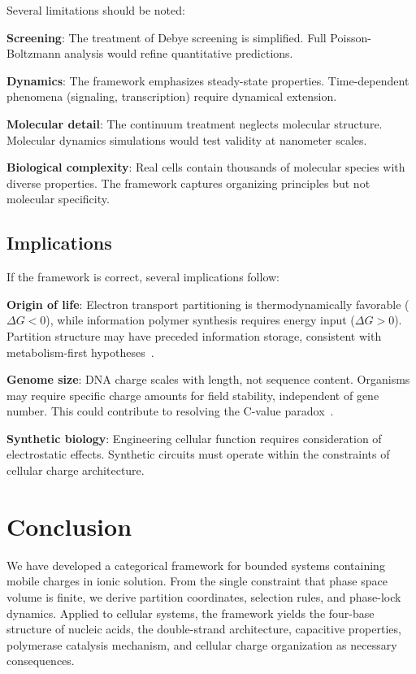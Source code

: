 \documentclass[twocolumn,aps,prb,superscriptaddress,longbibliography,floatfix]{revtex4-2}
\theoremstyle{remark}
\begin{document}
Several limitations should be noted:

\textbf{Screening}: The treatment of Debye screening is simplified.
Full Poisson-Boltzmann analysis would refine quantitative predictions.

\textbf{Dynamics}: The framework emphasizes steady-state properties.
Time-dependent phenomena (signaling, transcription) require dynamical
extension.

\textbf{Molecular detail}: The continuum treatment neglects molecular
structure. Molecular dynamics simulations would test validity at
nanometer scales.

\textbf{Biological complexity}: Real cells contain thousands of
molecular species with diverse properties. The framework captures
organizing principles but not molecular specificity.

\subsection{Implications}

If the framework is correct, several implications follow:

\textbf{Origin of life}: Electron transport partitioning is
thermodynamically favorable ($\Delta G < 0$), while information polymer
synthesis requires energy input ($\Delta G > 0$). Partition structure
may have preceded information storage, consistent with metabolism-first
hypotheses~\cite{Wachtershauser1988}.

\textbf{Genome size}: DNA charge scales with length, not sequence
content. Organisms may require specific charge amounts for field
stability, independent of gene number. This could contribute to
resolving the C-value paradox~\cite{Gregory2005}.

\textbf{Synthetic biology}: Engineering cellular function requires
consideration of electrostatic effects. Synthetic circuits must operate
within the constraints of cellular charge architecture.

\section{Conclusion}
\label{sec:conclusion}

We have developed a categorical framework for bounded systems containing
mobile charges in ionic solution. From the single constraint that phase
space volume is finite, we derive partition coordinates, selection rules,
and phase-lock dynamics. Applied to cellular systems, the framework
yields the four-base structure of nucleic acids, the double-strand
architecture, capacitive properties, polymerase catalysis mechanism, and
cellular charge organization as necessary consequences.
\end{document}

